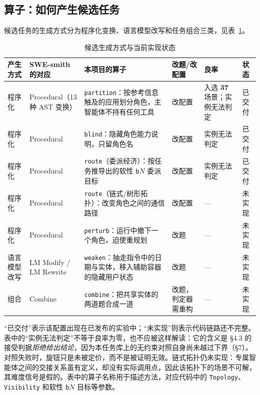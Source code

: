 \documentclass[UTF8,11pt,fontset=fandol]{ctexart}
\begin{document}
\subsection{算子：如何产生候选任务}

候选任务的生成方式分为程序化变换、语言模型改写和任务组合三类，见表~\ref{tab:operators}。

\begin{table}[H]
\centering
\small
\caption{候选生成方式与当前实现状态}
\label{tab:operators}
\begin{tabularx}{\textwidth}{>{\raggedright\arraybackslash}p{1.6cm} >{\raggedright\arraybackslash}p{2.2cm} X >{\raggedright\arraybackslash}p{1.5cm} >{\raggedright\arraybackslash}p{1.5cm} >{\raggedright\arraybackslash}p{1.3cm}}
\toprule
产生方式 & SWE-smith 的对应 & 本项目的算子 & 改题/改配置 & 良率 & 状态\\
\midrule
程序化 & Procedural（13 种 AST 变换） & \texttt{partition}：按参考信息触及的应用划分角色，主智能体不持有任何工具 & 改配置 & 入选 \textbf{37} 场景；实例无法判定 & 已交付\\
程序化 & Procedural & \texttt{blind}：隐藏角色能力说明，只留角色名 & 改配置 & 实例无法判定 & 已交付\\
程序化 & Procedural & \texttt{route}（委派经济）：按任务推导出的软性 \texttt{b}$N$ 委派目标 & 改配置 & 实例无法判定 & 已交付\\
程序化 & Procedural & \texttt{route}（链式/树形拓扑）：改变角色之间的通信路径 & 改配置 & --- & 未实现\\
程序化 & Procedural & \texttt{perturb}：运行中撤下一个角色，迫使重规划 & 改题 & --- & 未实现\\
语言模型改写 & LM Modify / LM Rewrite & \texttt{weaken}：抽走指令中的日期与实体，移入辅助容器的隐藏用户状态 & 改题 & --- & 未实现\\
组合 & Combine & \texttt{combine}：把共享实体的两道题合成一道 & 改题，判定器需重构 & --- & 未实现\\
\bottomrule
\end{tabularx}
\end{table}

“已交付”表示该配置出现在已发布的实验中；“未实现”则表示代码链路还不完整。表中的“实例无法判定”不等于良率为零，也不应被这样解读：它的含义是 \S4.3 的接受判据\emph{拒绝给出结论}，因为本任务库上的无约束对照自身尚未越过下界（\S7）。对照失败时，旋钮只是未被定价，而不是被证明无效。链式拓扑仍未实现：专属智能体之间的交接关系虽有定义，却没有实际调用点，因此该拓扑下的场景不可解，其难度信号是假的。表中的算子名称用于描述方法，对应代码中的 \texttt{Topology}、\texttt{Visibility} 和软性 \texttt{b}$N$ 目标等参数。
\end{document}
